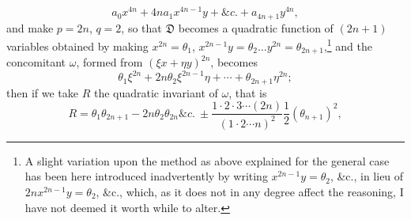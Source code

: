 \documentclass[11pt]{article}
\begin{document}
{{\[
a_0x^{4n}+4na_1x^{4n-1}y+\&c.+a_{4n+1}y^{4n},
\]
and make $p=2n$, $q=2$, so that $\mathfrak D$ becomes a quadratic function of $(2n+1)$ variables obtained by making $x^{2n}=\theta_1$, $x^{2n-1}y=\theta_2\ldots y^{2n}=\theta_{2n+1}$,\footnote{A slight variation upon the method as above explained for the general case has been here introduced inadvertently by writing $x^{2n-1}y=\theta_2$, \&c., in lieu of $2nx^{2n-1}y=\theta_2$, \&c., which, as it does not in any degree affect the reasoning, I have not deemed it worth while to alter.} and the concomitant $\omega$, formed from $(\xi x+\eta y)^{2n}$, becomes
\[
\theta_1\xi^{2n}+2n\theta_2\xi^{2n-1}\eta+\cdots+\theta_{2n+1}\eta^{2n};
\]
then if we take $R$ the quadratic invariant of $\omega$, that is
\[
R=\theta_1\theta_{2n+1}-2n\theta_2\theta_{2n}\&c.\ \pm
\frac{1\cdot2\cdot3\cdots(2n)}{(1\cdot2\cdots n)^2}\frac12(\theta_{n+1})^2,
\]

}}
\end{document}
